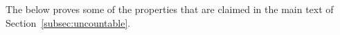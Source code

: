 \documentclass[twoside,11pt]{article}
\newcommand{\nats}{\mathbb{N}}
\newcommand{\reals}{\mathbb{R}}
\newcommand{\realsnonneg}{\reals_{\geq 0}}
\newcommand{\states}{\mathcal{X}}
\newcommand{\observs}{\mathcal{Y}}
\begin{document}
%
%

The below proves some of the properties that are claimed in the main text of Section~\ref{subsec:uncountable}.
\end{document}
